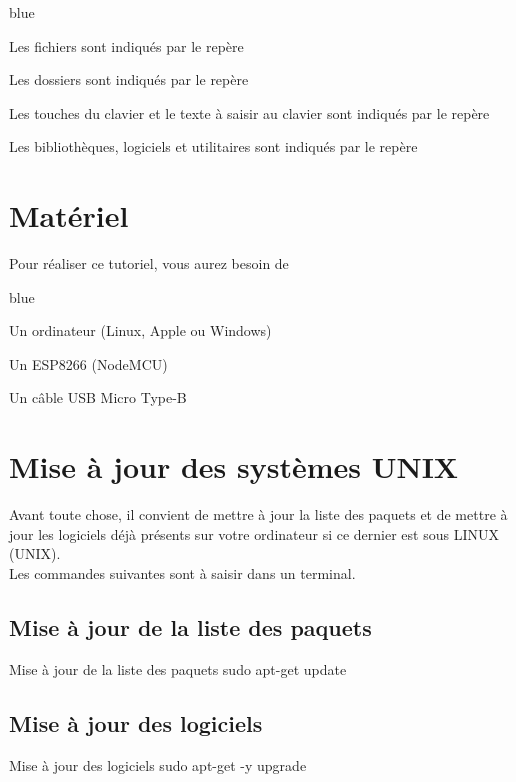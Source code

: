 {\begin{items}{blue}{\Triangle}
	\item Les fichiers sont indiqués par le repère 
	\item Les dossiers sont indiqués par le repère 
	\item Les touches du clavier et le texte à saisir au clavier sont indiqués par le repère 
	\item Les bibliothèques, logiciels et utilitaires sont indiqués par le repère 
\end{items}

\section{Matériel}

Pour réaliser ce tutoriel, vous aurez besoin de 

\begin{items}{blue}{\Triangle}
    \item Un ordinateur (Linux, Apple ou Windows)
    \item Un ESP8266 (NodeMCU)
    \item Un câble USB Micro Type-B
    
\end{items}

\section{Mise à jour des systèmes UNIX}

Avant toute chose, il convient de mettre à jour la liste des paquets et de mettre à jour les logiciels déjà présents sur votre ordinateur si ce dernier est sous LINUX (UNIX). \\
Les commandes suivantes sont à saisir dans un terminal.

\subsection{Mise à jour de la liste des paquets}

\begin{Bash}{Mise à jour de la liste des paquets}
sudo apt-get update
\end{Bash}


\subsection{Mise à jour des logiciels}
\begin{Bash}{Mise à jour des logiciels}
sudo apt-get -y upgrade
\end{Bash}

}
